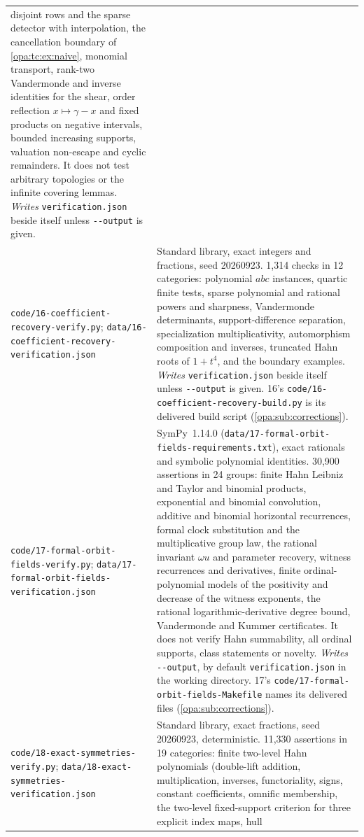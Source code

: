 \documentclass[11pt,oneside]{article}
\numberwithin{equation}{section}
\theoremstyle{definition}
\theoremstyle{remark}
\newcommand{\fn}[1]{\nolinkurl{#1}}
\begin{document}
\begin{center}
\begin{longtable}{>{\raggedright\arraybackslash}p{}>{\raggedright\arraybackslash}p{}}
disjoint rows and the sparse detector with interpolation, the cancellation boundary of
\cref{opa:tc:ex:naive}, monomial transport, rank-two Vandermonde and inverse identities for the shear,
order reflection $x\mapsto\gamma-x$ and fixed products on negative intervals, bounded increasing supports,
valuation non-escape and cyclic remainders. It does not test arbitrary topologies or the infinite covering
lemmas. \emph{Writes} \fn{verification.json} beside itself unless \fn{--output} is given.\\
\fn{code/16-coefficient-recovery-verify.py};
\fn{data/16-coefficient-recovery-verification.json} & Standard library, exact integers and fractions, seed
20260923. 1{,}314 checks in 12 categories: polynomial $abc$ instances, quartic finite tests, sparse polynomial
and rational powers and sharpness, Vandermonde determinants, support-difference separation, specialization
multiplicativity, automorphism composition and inverses, truncated Hahn roots of $1+t^4$, and the boundary
examples. \emph{Writes} \fn{verification.json} beside itself unless \fn{--output} is given. 16's
\fn{code/16-coefficient-recovery-build.py} is its delivered build script (\cref{opa:sub:corrections}).\\
\fn{code/17-formal-orbit-fields-verify.py};
\fn{data/17-formal-orbit-fields-verification.json} & SymPy~1.14.0 (\fn{data/17-formal-orbit-fields-requirements.txt}), exact
rationals and symbolic polynomial identities. 30{,}900 assertions in 24 groups: finite Hahn Leibniz and Taylor and binomial
products, exponential and binomial convolution, additive and binomial horizontal recurrences, formal clock substitution and the
multiplicative group law, the rational invariant $\omega u$ and parameter recovery, witness recurrences and derivatives, finite
ordinal-polynomial models of the positivity and decrease of the witness exponents, the rational logarithmic-derivative degree
bound, Vandermonde and Kummer certificates. It does not verify Hahn summability, all ordinal supports, class statements or
novelty. \emph{Writes} \fn{--output}, by default \fn{verification.json} in the working directory. 17's
\fn{code/17-formal-orbit-fields-Makefile} names its delivered files (\cref{opa:sub:corrections}).\\
\fn{code/18-exact-symmetries-verify.py};
\fn{data/18-exact-symmetries-verification.json} & Standard library, exact fractions, seed 20260923, deterministic. 11{,}330
assertions in 19 categories: finite two-level Hahn polynomials (double-lift addition, multiplication, inverses, functoriality,
signs, constant coefficients, omnific membership, the two-level fixed-support criterion for three explicit index maps, hull

\end{longtable}
\end{center}
\end{document}
